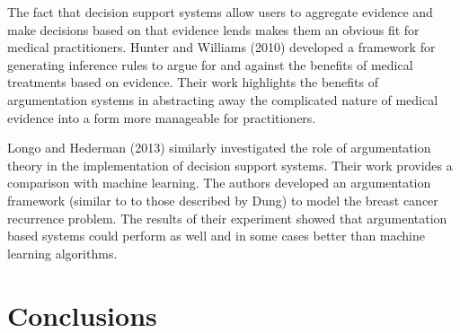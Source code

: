 The fact that decision support systems allow users to aggregate evidence and make decisions based on that evidence lends makes them an obvious fit for medical practitioners. Hunter and Williams (2010) developed a framework for generating inference rules to argue for and against the benefits of medical treatments based on evidence. Their work highlights the benefits of argumentation systems in abstracting away the complicated nature of medical evidence into a form more manageable for practitioners.

Longo and Hederman (2013) similarly investigated the role of argumentation theory in the implementation of decision support systems. Their work provides a comparison with machine learning. The authors developed an argumentation framework (similar to to those described by Dung) to model the breast cancer recurrence problem. The results of their experiment showed that argumentation based systems could perform as well and in some cases better than machine learning algorithms.



\section{Conclusions}
